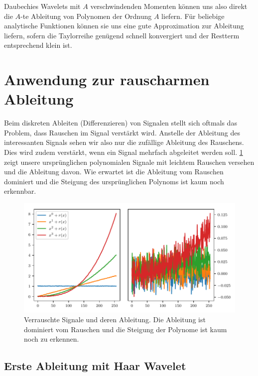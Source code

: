 \begin{refsection}
Daubechies Wavelets mit $A$ verschwindenden Momenten können uns also direkt die
$A$-te Ableitung von Polynomen der Ordnung $A$ liefern. Für beliebige
analytische Funktionen können sie uns eine gute Approximation zur Ableitung
liefern, sofern die Taylorreihe genügend schnell konvergiert und der Restterm
entsprechend klein ist.

\section{Anwendung zur rauscharmen Ableitung}

Beim diskreten Ableiten (Differenzieren) von Signalen stellt sich oftmals das
Problem, dass Rauschen im Signal verstärkt wird. Anstelle der Ableitung des
interessanten Signals sehen wir also nur die zufällige Ableitung des Rauschens.
Dies wird zudem verstärkt, wenn ein Signal mehrfach abgeleitet werden soll.
\cref{polynomials:noise:signals} zeigt unsere ursprünglichen polynomialen
Signale mit leichtem Rauschen versehen und die Ableitung davon. Wie erwartet
ist die Ableitung vom Rauschen dominiert und die Steigung des ursprünglichen
Polynoms ist kaum noch erkennbar.

\begin{figure}
    \centering
    \includegraphics{papers/polynomials/images/polynomials_noise_signals.pdf}
    \caption{Verrauschte Signale und deren Ableitung. Die Ableitung ist
             dominiert vom Rauschen und die Steigung der Polynome ist kaum noch
             zu erkennen.\label{polynomials:noise:signals}}
\end{figure}

\subsection{Erste Ableitung mit Haar Wavelet}


\end{refsection}
